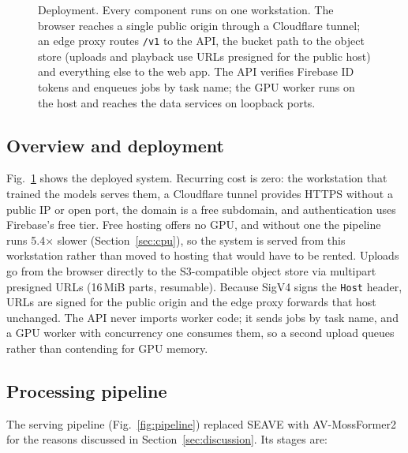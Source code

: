 \documentclass[conference]{IEEEtran}
\begin{document}
\begin{figure}[t]
{}
\caption{Deployment. Every component runs on one workstation. The browser reaches a single public origin through a Cloudflare tunnel; an edge proxy routes \texttt{/v1} to the API, the bucket path to the object store (uploads and playback use URLs presigned for the public host) and everything else to the web app. The API verifies Firebase ID tokens and enqueues jobs by task name; the GPU worker runs on the host and reaches the data services on loopback ports.}
\label{fig:arch}
\end{figure}

\subsection{Overview and deployment}
Fig.~\ref{fig:arch} shows the deployed system. Recurring cost is zero: the workstation that trained the models serves them, a Cloudflare tunnel provides HTTPS without a public IP or open port, the domain is a free subdomain, and authentication uses Firebase's free tier. Free hosting offers no GPU, and without one the pipeline runs 5.4$\times$ slower (Section~\ref{sec:cpu}), so the system is served from this workstation rather than moved to hosting that would have to be rented. Uploads go from the browser directly to the S3-compatible object store via multipart presigned URLs (16\,MiB parts, resumable). Because SigV4 signs the \texttt{Host} header, URLs are signed for the public origin and the edge proxy forwards that host unchanged. The API never imports worker code; it sends jobs by task name, and a GPU worker with concurrency one consumes them, so a second upload queues rather than contending for GPU memory.

\subsection{Processing pipeline}
The serving pipeline (Fig.~\ref{fig:pipeline}) replaced SEAVE with AV-MossFormer2~\cite{clearervoice} for the reasons discussed in Section~\ref{sec:discussion}. Its stages are:
\end{document}
